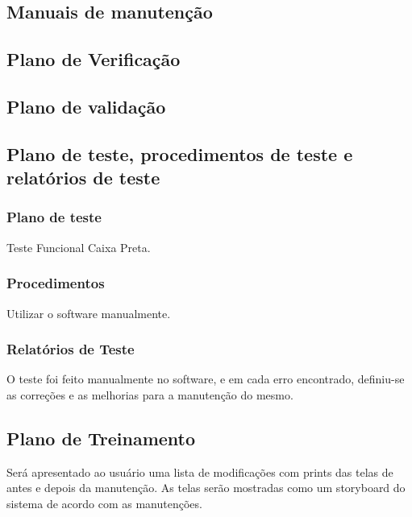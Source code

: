 \pagebreak

\subsection{Manuais de manutenção}

\subsection{Plano de Verificação}

\subsection{Plano de validação}

\subsection{Plano de teste, procedimentos de teste e relatórios de teste}

\subsubsection{Plano de teste}

Teste Funcional Caixa Preta.

\subsubsection{Procedimentos}

Utilizar o software manualmente.

\subsubsection{Relatórios de Teste}
O teste foi feito manualmente no software, e em cada erro encontrado, definiu-se as correções e as melhorias para a manutenção do mesmo.

\pagebreak

\subsection{Plano de Treinamento}

 Será apresentado ao usuário uma lista de modificações com prints das telas de antes e depois da manutenção. 
 As telas serão mostradas como um storyboard do sistema de acordo com as manutenções.

